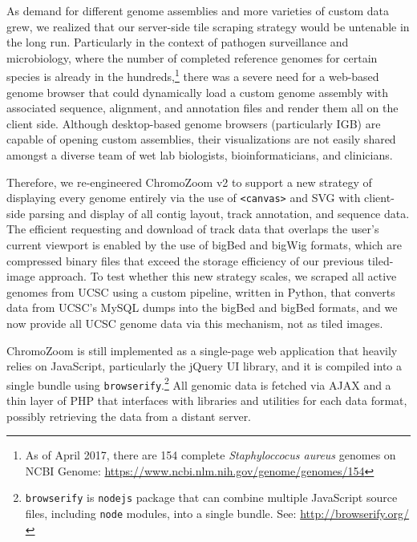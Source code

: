 As demand for different genome assemblies and more varieties of custom data grew, we realized that our server-side tile scraping strategy would be untenable in the long run. Particularly in the context of pathogen surveillance and microbiology, where the number of completed reference genomes for certain species is already in the hundreds,\footnote{As of April 2017, there are 154 complete \emph{Staphyloccocus aureus} genomes on NCBI Genome: \url{https://www.ncbi.nlm.nih.gov/genome/genomes/154}} there was a severe need for a web-based genome browser that could dynamically load a custom genome assembly with associated sequence, alignment, and annotation files and render them all on the client side. Although desktop-based genome browsers (particularly IGB) are capable of opening custom assemblies, their visualizations are not easily shared amongst a diverse team of wet lab biologists, bioinformaticians, and clinicians.

Therefore, we re-engineered ChromoZoom v2 to support a new strategy of displaying every genome entirely via the use of \texttt{<canvas>} and SVG with client-side parsing and display of all contig layout, track annotation, and sequence data. The efficient requesting and download of track data that overlaps the user's current viewport is enabled by the use of bigBed and bigWig formats,\autocite{Kent2010} which are compressed binary files that exceed the storage efficiency of our previous tiled-image approach. To test whether this new strategy scales, we scraped all active genomes from UCSC using a custom pipeline, written in Python, that converts data from UCSC's MySQL dumps into the bigBed and bigBed formats, and we now provide all UCSC genome data via this mechanism, not as tiled images.

ChromoZoom is still implemented as a single-page web application that heavily relies on JavaScript, particularly the jQuery UI library, and it is compiled into a single bundle using \texttt{browserify}.\footnote{\texttt{browserify} is \texttt{nodejs} package that can combine multiple JavaScript source files, including \texttt{node} modules, into a single bundle. See: \url{http://browserify.org/}} All genomic data is fetched via AJAX and a thin layer of PHP that interfaces with libraries and utilities for each data format, possibly retrieving the data from a distant server.

